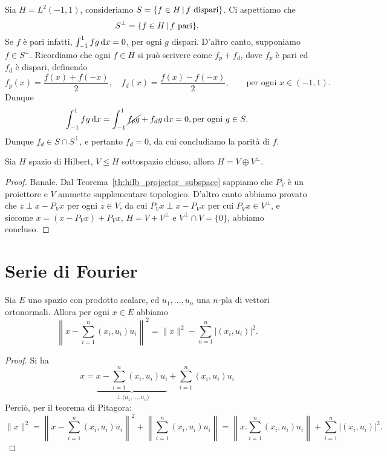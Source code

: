 \begin{example}
	Sia $H=L^2(-1,1)$, consideriamo $S=\{f \in H \,|\, \text{$f$ dispari}\}$. Ci aspettiamo che
	\begin{equation*}
		S^\perp = \{f \in H \,|\, \text{$f$ pari}\}.
	\end{equation*}
	Se $f$ è pari infatti, $\int_{-1}^1 fg \,\mathrm{d} x = 0$, per ogni $g$ dispari. D'altro canto, supponiamo $f \in S^\perp$. Ricordiamo che ogni $f \in H$ si può scrivere come $f_p + f_d$, dove $f_p$ è pari ed $f_d$ è dispari, definendo
	\begin{equation*}
		f_p(x) = \frac{f(x) + f(-x)}2, \quad f_d(x) = \frac{f(x) - f(-x)}2, \qquad \text{per ogni $x \in (-1,1)$}.
	\end{equation*}
	Dunque
	\begin{equation*}
		\int_{-1}^1 f g\,\mathrm{d} x = \int_{-1}^1 \cancel{f_pg} + f_dg\,\mathrm{d} x = 0, \text{per ogni $g \in S$}.
	\end{equation*}
	Dunque $f_d \in S \cap S^\perp$, e pertanto $f_d = 0$, da cui concludiamo la parità di $f$.
\end{example}

\begin{theorem}
\label{th:hilb_ort_decomp}
	Sia $H$ spazio di Hilbert, $V \leq H$ sottospazio chiuso, allora $H = V \oplus V^\perp$.
\end{theorem}
\begin{proof}
	Banale. Dal Teorema~\ref{th:hilb_projector_subspace} sappiamo che $P_V$ è un proiettore e $V$ ammette supplementare topologico. D'altro canto abbiamo provato che $z \perp x-P_V x$ per ogni $z \in V$, da cui $P_V x \perp x - P_V x$ per cui $P_V x \in V^\perp$, e siccome $x = (x-P_V x)+ P_V x$, $H = V + V^\perp$ e $V^\perp \cap V = \{0\}$, abbiamo concluso.
\end{proof}

\section{Serie di Fourier}
\begin{lemma}
	Sia $E$ uno spazio con prodotto scalare, ed $u_1, \ldots, u_n$ una $n$-pla di vettori ortonormali.
	Allora per ogni $x \in E$ abbiamo
	\begin{equation*}
		\left\|x - \sum_{i=1}^n (x_i,u_i)u_i \right\|^2 = \|x\|^2 - \sum_{n=1}^n |(x_i,u_i)|^2.
	\end{equation*}
\end{lemma}
\begin{proof}
	Si ha
	\begin{equation*}
		x = \underbrace{x- \sum_{i=1}^n (x_i, u_i)u_i}_{\perp \langle u_1, \ldots, u_n \rangle} + \sum_{i=1}^n (x_i, u_i)u_i
	\end{equation*}
	Perciò, per il teorema di Pitagora:
	\begin{equation*}
		\|x\|^2 = \left\|x - \sum_{i=1}^n (x_i, u_i)u_i \right\|^2 + \left\| \sum_{i=1}^n (x_i,u_i)u_i\right\| = \left\| x. \sum_{i=1}^n (x_i,u_i)u_i \right\| + \sum_{i=1}^n |(x_i,u_i)|^2.
	\end{equation*}
\end{proof}

